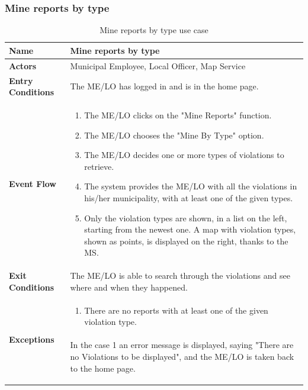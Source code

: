 					\subsubsection{Mine reports by type}
					\begin{table}[!h]
						\centering
						\vspace{-2mm}
						\begin{tabular}{lp{}}
							\toprule
							\textbf{Name} & \textbf{Mine reports by type} \\[1mm]
							\midrule
							\textbf{Actors} & Municipal Employee, Local Officer, Map Service \\[1mm]
							\textbf{Entry Conditions} & The ME/LO has logged in and is in the home page. \vspace{1mm}\\
							\textbf{Event Flow} &
							\vspace{-5mm} 
							\begin{enumerate}
								\setlength\itemsep{0.2mm}
								\item The ME/LO clicks on the "Mine Reports" function.
								\item The ME/LO chooses the "Mine By Type" option.
								\item The ME/LO decides one or more types of violations to retrieve.
								\item The system provides the ME/LO with all the violations in his/her municipality, with at least one of the given types.
								\item Only the violation types are shown, in a list on the left, starting from the newest one. A map with violation types, shown as points, is displayed on the right, thanks to the MS.
							\end{enumerate} \\
							\textbf{Exit Conditions} & The ME/LO is able to search through the violations and see where and when they happened. \vspace{1mm}\\
							\textbf{Exceptions} & 
								\vspace{-5mm} 
								\begin{enumerate}
									\item There are no reports with at least one of the given violation type.
								\end{enumerate}
								\vspace{-7mm}
								\paragraph{}
									In the case 1 an error message is displayed, saying "There are no Violations to be displayed", and the ME/LO is taken back to the home page. \\
							\bottomrule
						\end{tabular}
						\caption{Mine reports by type use case}
					\end{table}
					\clearpage

